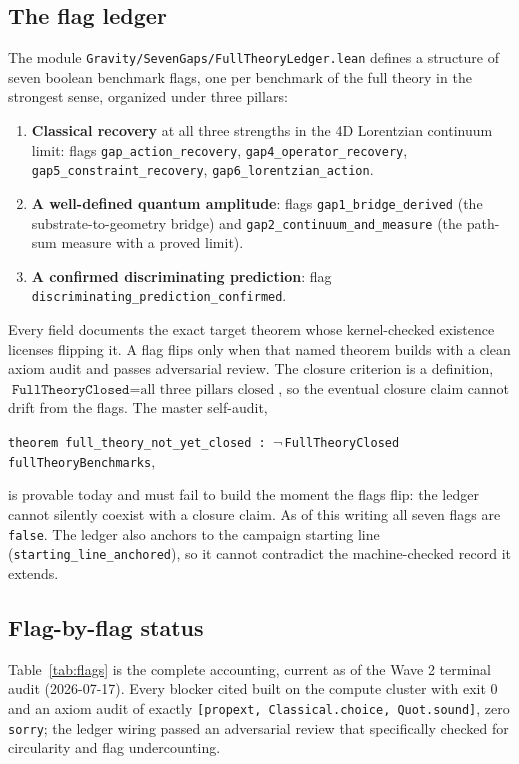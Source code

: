 \documentclass[11pt,letterpaper]{article}
\newcommand{\lean}[1]{\texttt{#1}}
\begin{document}
\subsection{The flag ledger}

The module \lean{Gravity/SevenGaps/FullTheoryLedger.lean} defines a structure of seven boolean benchmark flags, one per benchmark of the full theory in the strongest sense, organized under three pillars:
\begin{enumerate}
\item \textbf{Classical recovery} at all three strengths in the 4D Lorentzian continuum limit: flags \lean{gap\_action\_recovery}, \lean{gap4\_operator\_recovery}, \lean{gap5\_constraint\_recovery}, \lean{gap6\_lorentzian\_action}.
\item \textbf{A well-defined quantum amplitude}: flags \lean{gap1\_bridge\_derived} (the substrate-to-geometry bridge) and \lean{gap2\_continuum\_and\_measure} (the path-sum measure with a proved limit).
\item \textbf{A confirmed discriminating prediction}: flag \lean{discriminating\_prediction\_confirmed}.
\end{enumerate}
Every field documents the exact target theorem whose kernel-checked existence licenses flipping it. A flag flips only when that named theorem builds with a clean axiom audit and passes adversarial review. The closure criterion is a definition, $\lean{FullTheoryClosed}=\text{all three pillars closed}$, so the eventual closure claim cannot drift from the flags. The master self-audit,
\begin{center}
\lean{theorem full\_theory\_not\_yet\_closed :\ }$\neg$\,\lean{FullTheoryClosed fullTheoryBenchmarks},
\end{center}
is provable today and must fail to build the moment the flags flip: the ledger cannot silently coexist with a closure claim. As of this writing all seven flags are \lean{false}. The ledger also anchors to the campaign starting line (\lean{starting\_line\_anchored}), so it cannot contradict the machine-checked record it extends.

\subsection{Flag-by-flag status}

Table~\ref{tab:flags} is the complete accounting, current as of the Wave 2 terminal audit (2026-07-17). Every blocker cited built on the compute cluster with exit 0 and an axiom audit of exactly \lean{[propext, Classical.choice, Quot.sound]}, zero \lean{sorry}; the ledger wiring passed an adversarial review that specifically checked for circularity and flag undercounting.
\end{document}
